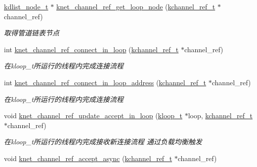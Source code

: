\begin{DoxyCompactItemize}
\hyperlink{a00051_ac701f00a0851c97467ae35c382b316b7_ac701f00a0851c97467ae35c382b316b7}{kdlist\+\_\+node\+\_\+t} $\ast$ \hyperlink{a00049_acdd3ead2d27ffb0a86eba8f509631433_acdd3ead2d27ffb0a86eba8f509631433}{knet\+\_\+channel\+\_\+ref\+\_\+get\+\_\+loop\+\_\+node} (\hyperlink{a00051_a3b7e82599367eade261456f60ebe2cd9_a3b7e82599367eade261456f60ebe2cd9}{kchannel\+\_\+ref\+\_\+t} $\ast$channel\+\_\+ref)
\begin{DoxyCompactList}\small\item\em 取得管道链表节点 \end{DoxyCompactList}\item 
int \hyperlink{a00049_a6073314ca2d5893cf909982114ff6b9c_a6073314ca2d5893cf909982114ff6b9c}{knet\+\_\+channel\+\_\+ref\+\_\+connect\+\_\+in\+\_\+loop} (\hyperlink{a00051_a3b7e82599367eade261456f60ebe2cd9_a3b7e82599367eade261456f60ebe2cd9}{kchannel\+\_\+ref\+\_\+t} $\ast$channel\+\_\+ref)
\begin{DoxyCompactList}\small\item\em 在kloop\+\_\+t所运行的线程内完成连接流程 \end{DoxyCompactList}\item 
int \hyperlink{a00049_ab64661cda8927dfc74879f1f4a4bff13_ab64661cda8927dfc74879f1f4a4bff13}{knet\+\_\+channel\+\_\+ref\+\_\+connect\+\_\+in\+\_\+loop\+\_\+address} (\hyperlink{a00051_a3b7e82599367eade261456f60ebe2cd9_a3b7e82599367eade261456f60ebe2cd9}{kchannel\+\_\+ref\+\_\+t} $\ast$channel\+\_\+ref)
\begin{DoxyCompactList}\small\item\em 在kloop\+\_\+t所运行的线程内完成连接流程 \end{DoxyCompactList}\item 
void \hyperlink{a00049_a0f7a4b69f5d64aebd6b33ca0a4311ffb_a0f7a4b69f5d64aebd6b33ca0a4311ffb}{knet\+\_\+channel\+\_\+ref\+\_\+update\+\_\+accept\+\_\+in\+\_\+loop} (\hyperlink{a00051_a97fc76209a58362019f1ded9169e397f_a97fc76209a58362019f1ded9169e397f}{kloop\+\_\+t} $\ast$loop, \hyperlink{a00051_a3b7e82599367eade261456f60ebe2cd9_a3b7e82599367eade261456f60ebe2cd9}{kchannel\+\_\+ref\+\_\+t} $\ast$channel\+\_\+ref)
\begin{DoxyCompactList}\small\item\em 在kloop\+\_\+t所运行的线程内完成接收新连接流程 通过负载均衡触发 \end{DoxyCompactList}\item 
void \hyperlink{a00049_ac8b7765a914482ea59e209704f8f0fac_ac8b7765a914482ea59e209704f8f0fac}{knet\+\_\+channel\+\_\+ref\+\_\+accept\+\_\+async} (\hyperlink{a00051_a3b7e82599367eade261456f60ebe2cd9_a3b7e82599367eade261456f60ebe2cd9}{kchannel\+\_\+ref\+\_\+t} $\ast$channel\+\_\+ref)

\end{DoxyCompactItemize}
